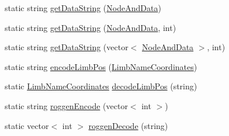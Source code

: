 \begin{DoxyCompactItemize}
static string \hyperlink{classDataStrings_ae3279bea5f297a4244c726231489397d}{getDataString} (\hyperlink{structNodeAndData}{NodeAndData})
\item 
static string \hyperlink{classDataStrings_ae4666d61ff8ee1bd2630041a0c812436}{getDataString} (\hyperlink{structNodeAndData}{NodeAndData}, int)
\item 
static string \hyperlink{classDataStrings_a58aaa4afbc8154c8e68da0572b1c3da1}{getDataString} (vector$<$ \hyperlink{structNodeAndData}{NodeAndData} $>$, int)
\item 
static string \hyperlink{classDataStrings_a822ab320fceb49de214ba804860e21e4}{encodeLimbPos} (\hyperlink{structLimbNameCoordinates}{LimbNameCoordinates})
\item 
static \hyperlink{structLimbNameCoordinates}{LimbNameCoordinates} \hyperlink{classDataStrings_a46f7f77ab083ffbd1a3835d71e4a0014}{decodeLimbPos} (string)
\item 
static string \hyperlink{classDataStrings_a1b7a08e71cc0fe63e26a0c508ce8b9f1}{roggenEncode} (vector$<$ int $>$)
\item 
static vector$<$ int $>$ \hyperlink{classDataStrings_a4371afe9ad92957610f64276c5afec19}{roggenDecode} (string)
\end{DoxyCompactItemize}


